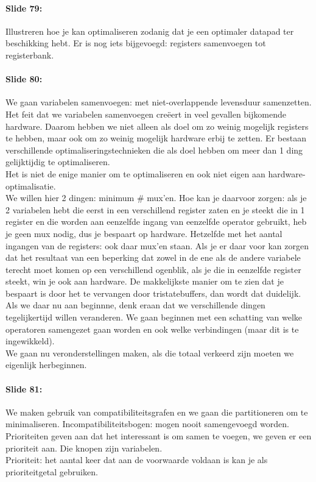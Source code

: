 \documentclass[10pt,a4paper]{book}
\begin{document}
\paragraph{Slide 79:} Illustreren hoe je kan optimaliseren zodanig dat je een optimaler datapad ter beschikking hebt. Er is nog iets bijgevoegd: registers samenvoegen tot registerbank.

\paragraph{Slide 80:} We gaan variabelen samenvoegen: met niet-overlappende levensduur samenzetten. Het feit dat we variabelen samenvoegen cre\"eert in veel gevallen bijkomende hardware. Daarom hebben we niet alleen als doel om zo weinig mogelijk registers te hebben, maar ook om zo weinig mogelijk hardware erbij te zetten. Er bestaan verschillende optimaliseringstechnieken die als doel hebben om meer dan 1 ding gelijktijdig te optimaliseren.\\
Het is niet de enige manier om te optimaliseren en ook niet eigen aan hardware-optimalisatie.\\
We willen hier 2 dingen: minimum \# mux'en. Hoe kan je daarvoor zorgen: als je 2 variabelen hebt die eerst in een verschillend register zaten en je steekt die in 1 register en die worden aan eenzelfde ingang van eenzelfde operator gebruikt, heb je geen mux nodig, dus je bespaart op hardware. Hetzelfde met het aantal ingangen van de registers: ook daar mux'en staan. Als je er daar voor kan zorgen dat het resultaat van een beperking dat zowel in de ene als de andere variabele terecht moet komen op een verschillend ogenblik, als je die in eenzelfde register steekt, win je ook aan hardware. De makkelijkste manier om te zien dat je bespaart is door het te vervangen door tristatebuffers, dan wordt dat duidelijk.\\
Als we daar nu aan beginnne, denk eraan dat we verschillende dingen tegelijkertijd willen veranderen. We gaan beginnen met een schatting van welke operatoren samengezet gaan worden en ook welke verbindingen (maar dit is te ingewikkeld).\\
We gaan nu veronderstellingen maken, als die totaal verkeerd zijn moeten we eigenlijk herbeginnen.

\paragraph{Slide 81:} We maken gebruik van compatibiliteitsgrafen en we gaan die partitioneren om te minimaliseren. Incompatibiliteitsbogen: mogen nooit samengevoegd worden. Prioriteiten geven aan dat het interessant is om samen te voegen, we geven er een prioriteit aan. Die knopen zijn variabelen.\\
Prioriteit: het aantal keer dat aan de voorwaarde voldaan is kan je als prioriteitgetal gebruiken.
\end{document}
